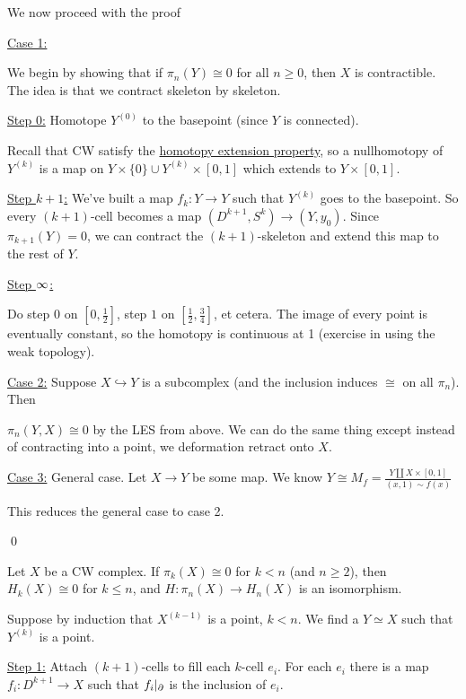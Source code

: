 \documentclass[x11names,reqno,14pt]{extarticle}
\newcommand{\into}{\hookrightarrow}
\begin{document}
We now proceed with the proof

\underline{Case 1:} 

We begin by showing that if $\pi_n(Y) \cong 0$ for all $n \geq 0$, then $X$ is contractible. The idea is that we contract skeleton by skeleton. 

\underline{Step 0:} Homotope $Y^{(0)}$ to the basepoint (since $Y$ is connected).

Recall that CW satisfy the \underline{homotopy extension property}, so a nullhomotopy of $Y^{(k)}$ is a map on $Y\times\{0\} \cup Y^{(k)} \times [0, 1]$ which extends to $Y\times[0,1]$. 

\underline{Step $k + 1$:} We've built a map $f_k:Y\to Y$ such that $Y^{(k)}$ goes to the basepoint. So every $(k + 1)$-cell becomes a map $(D^{k + 1}, S^k) \to (Y, y_0)$. Since $\pi_{k + 1}(Y) = 0$, we can contract the $(k + 1)$-skeleton and extend this map to the rest of $Y$. 

\underline{Step $\infty$:}

Do step $0$ on $[0,\frac12]$, step $1$ on $[\frac12,\frac34]$, et cetera. The image of every point is eventually constant, so the homotopy is continuous at 1 (exercise in using the weak topology).

\underline{Case 2:} Suppose $X \into Y$ is a subcomplex (and the inclusion induces $\cong$ on all $\pi_n$). Then

$\pi_n(Y, X)\cong 0$ by the LES from above. We can do the same thing except instead of contracting into a point, we deformation retract onto $X$.

\underline{Case 3:} General case. Let $X \to Y$ be some map. We know $Y \cong M_f = \frac{Y \coprod X\times[0,1]}{(x,1)\sim f(x)}$

This reduces the general case to case 2. 

\qed


Let $X$ be a CW complex. If $\pi_k(X) \cong 0$ for $k < n$ (and $n\geq2$), then $H_k(X)\cong 0$ for $k \leq n$, and $H:\pi_n(X) \to H_n(X)$ is an isomorphism. 

\proof

Suppose by induction that $X^{(k-1)}$ is a point, $k < n$. We find a $Y \simeq X$ such that $Y^{(k)}$ is a point. 

\underline{Step 1:} Attach $(k + 1)$-cells to fill each $k$-cell $e_i$. For each $e_i$ there is a map $f_i:D^{k + 1} \to X$ such that $f_i|_{\partial}$ is the inclusion of $e_i$.
\end{document}
